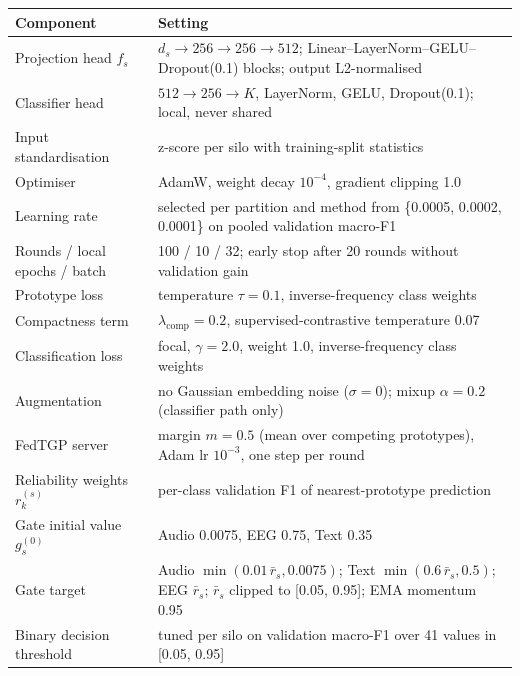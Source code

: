 \begin{tabular}{p{}p{}}
\toprule
\textbf{Component} & \textbf{Setting} \\
\midrule
Projection head $f_s$ & $d_s\!\to\!256\!\to\!256\!\to\!512$; Linear--LayerNorm--GELU--Dropout(0.1) blocks; output L2-normalised \\
Classifier head & $512\!\to\!256\!\to\!K$, LayerNorm, GELU, Dropout(0.1); local, never shared \\
Input standardisation & z-score per silo with training-split statistics \\
Optimiser & AdamW, weight decay $10^{-4}$, gradient clipping 1.0 \\
Learning rate & selected per partition and method from \{0.0005, 0.0002, 0.0001\} on pooled validation macro-F1 \\
Rounds / local epochs / batch & 100 / 10 / 32; early stop after 20 rounds without validation gain \\
Prototype loss & temperature $\tau=0.1$, inverse-frequency class weights \\
Compactness term & $\lambda_{\mathrm{comp}}=0.2$, supervised-contrastive temperature 0.07 \\
Classification loss & focal, $\gamma=2.0$, weight 1.0, inverse-frequency class weights \\
Augmentation & no Gaussian embedding noise ($\sigma=0$); mixup $\alpha=0.2$ (classifier path only) \\
FedTGP server & margin $m=0.5$ (mean over competing prototypes), Adam lr $10^{-3}$, one step per round \\
Reliability weights $r_k^{(s)}$ & per-class validation F1 of nearest-prototype prediction \\
Gate initial value $g_s^{(0)}$ & Audio 0.0075, EEG 0.75, Text 0.35 \\
Gate target & Audio $\min(0.01\,\bar r_s,0.0075)$; Text $\min(0.6\,\bar r_s,0.5)$; EEG $\bar r_s$; $\bar r_s$ clipped to [0.05, 0.95]; EMA momentum 0.95 \\
Binary decision threshold & tuned per silo on validation macro-F1 over 41 values in [0.05, 0.95] \\
\bottomrule
\end{tabular}